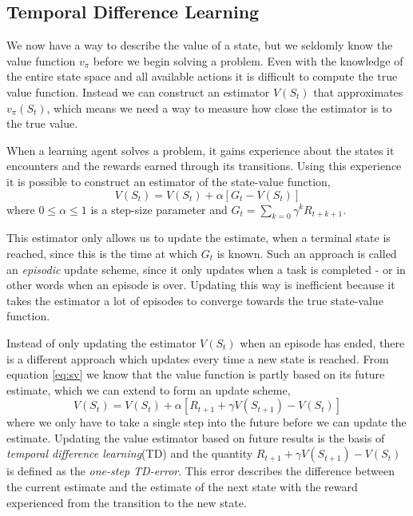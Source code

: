 \documentclass[11pt]{article}
\begin{document}
\maketitle

\subsection{Temporal Difference Learning}\label{sec:td}

We now have a way to describe the value of a state, but we seldomly know the
value function $v_\pi$ before we begin solving a problem.
Even with the knowledge of the entire state space and all available actions
it is difficult to compute the true value function.
Instead we can construct an estimator $V(S_t)$ that
approximates $v_\pi(S_t)$, which means we need a way
to measure how close the estimator is to the true value.

When a learning agent solves a problem, it gains experience
about the states it encounters and the rewards earned through its transitions.
Using this experience it is possible to construct an estimator 
of the state-value function,
\begin{equation}
    V(S_t) = V(S_t) + \alpha [G_t - V(S_t)]
\end{equation}
where $0 \leq \alpha \leq 1$ is a step-size parameter and
$G_t = \sum\limits_{k=0} \gamma^k R_{t+k+1}$.

This estimator only allows us to update the estimate, when a
terminal state is reached, since this is the time at which $G_t$ is known.
Such an approach is called an \textit{episodic} update scheme, since it only
updates when a task is completed - or in other words when an episode
is over.
Updating this way is inefficient because it takes the estimator
a lot of episodes to converge towards the true state-value function.

Instead of only updating the estimator $V(S_t)$ when an episode has
ended, there is a different approach which updates
every time a new state is reached.
From equation \ref{eq:sv} we know that the value function is partly based on its future
estimate, which we can extend to form an update scheme,
\begin{equation}\label{eq:up}
    V(S_t) = V(S_t) + \alpha  [R_{t+1} + \gamma  V(S_{t+1}) - V(S_t)]
\end{equation}
where we only have to take a single step into the future before we can 
update the estimate.
Updating the value estimator based on future results is the basis
of \textit{temporal difference learning}(TD) and the quantity $R_{t+1} + \gamma  V(S_{t+1}) - V(S_t)$
is defined as the \textit{one-step TD-error}.
This error describes the difference between the current estimate
and the estimate of the next state with the reward experienced from the
transition to the new state.
\end{document}
